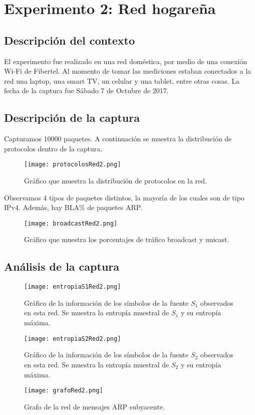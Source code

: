\section{Experimento 2: Red hogareña}

\subsection{Descripción del contexto}

El experimento fue realizado en una red doméstica, por medio de una conexión Wi-Fi de Fibertel. Al momento de tomar las mediciones estaban conectados a la red una laptop, una smart TV, un celular y una tablet, entre otras cosas. La fecha de la captura fue Sábado 7 de Octubre de 2017.

\subsection{Descripción de la captura}

Capturamos 10000 paquetes. A continuación se muestra la distribución de protocolos dentro de la captura.
\begin{figure}[H]
\centering
\texttt{[image: protocolosRed2.png]}
\caption{Gráfico que muestra la distribución de protocolos en la red.}
\label{protocolos2}
\end{figure}

Observamos 4 tipos de paquetes distintos, la mayoría de los cuales son de tipo IPv4. Además, hay BLA\% de paquetes ARP.
\begin{figure}[H]
\centering
\texttt{[image: broadcastRed2.png]}
\caption{Gráfico que muestra los porcentajes de tráfico broadcast y unicast.}
\label{broadcast2}
\end{figure}

\subsection{Análisis de la captura}

\begin{figure}[H]
\centering
\texttt{[image: entropiaS1Red2.png]}
\caption{Gráfico de la información de los símbolos de la fuente $S_1$ observados en esta red. Se muestra la entropía muestral de $S_1$ y su entropía máxima.}
\label{entropias1_2}
\end{figure}

\begin{figure}[H]
\centering
\texttt{[image: entropiaS2Red2.png]}
\caption{Gráfico de la información de los símbolos de la fuente $S_2$ observados en esta red. Se muestra la entropía muestral de $S_2$ y su entropía máxima.}
\label{entropias2_2}
\end{figure}

\begin{figure}[H]
\centering
\texttt{[image: grafoRed2.png]}
\caption{Grafo de la red de mensajes ARP subyacente.}
\label{grafo2}
\end{figure}
